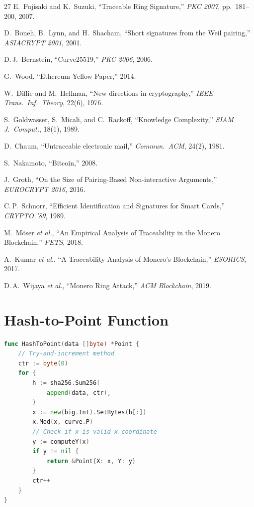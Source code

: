 \documentclass[11pt,a4paper]{article}
\begin{document}
\begin{thebibliography}{27}
E.~Fujisaki and K.~Suzuki,
``Traceable Ring Signature,''
\emph{PKC 2007}, pp.~181--200, 2007.

D.~Boneh, B.~Lynn, and H.~Shacham,
``Short signatures from the Weil pairing,''
\emph{ASIACRYPT 2001}, 2001.

D.\,J.~Bernstein,
``Curve25519,''
\emph{PKC 2006}, 2006.

G.~Wood,
``Ethereum Yellow Paper,''
2014.

W.~Diffie and M.~Hellman,
``New directions in cryptography,''
\emph{IEEE Trans.\ Inf.\ Theory}, 22(6), 1976.

S.~Goldwasser, S.~Micali, and C.~Rackoff,
``Knowledge Complexity,''
\emph{SIAM J.\ Comput.}, 18(1), 1989.

D.~Chaum,
``Untraceable electronic mail,''
\emph{Commun.\ ACM}, 24(2), 1981.

S.~Nakamoto,
``Bitcoin,''
2008.

J.~Groth,
``On the Size of Pairing-Based Non-interactive Arguments,''
\emph{EUROCRYPT 2016}, 2016.

C.\,P.~Schnorr,
``Efficient Identification and Signatures for Smart Cards,''
\emph{CRYPTO '89}, 1989.

M.~M\"oser \emph{et al.},
``An Empirical Analysis of Traceability in the Monero Blockchain,''
\emph{PETS}, 2018.

A.~Kumar \emph{et al.},
``A Traceability Analysis of Monero's Blockchain,''
\emph{ESORICS}, 2017.

D.\,A.~Wijaya \emph{et al.},
``Monero Ring Attack,''
\emph{ACM Blockchain}, 2019.

\end{thebibliography}

\appendix

\section{Hash-to-Point Function}
\label{app:hash-to-point}

\begin{lstlisting}[language=Go,caption={Hash to Curve Point}]
func HashToPoint(data []byte) *Point {
    // Try-and-increment method
    ctr := byte(0)
    for {
        h := sha256.Sum256(
            append(data, ctr),
        )
        x := new(big.Int).SetBytes(h[:])
        x.Mod(x, curve.P)
        // Check if x is valid x-coordinate
        y := computeY(x)
        if y != nil {
            return &Point{X: x, Y: y}
        }
        ctr++
    }
}
\end{lstlisting}
\end{document}
